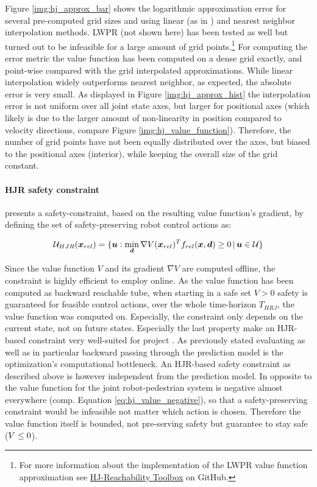 Figure \ref{img:hj_approx_bar} shows the logarithmic approximation error for several pre-computed grid sizes and using linear (as in \cite{Leung2020}) and nearest neighbor interpolation methods. LWPR (not shown here) has been tested as well but turned out to be infeasible for a large amount of grid points.\footnote{For more information about the implementation of the LWPR value function approximation see \href{https://github.com/simon-schaefer/HJReachibility}{HJ-Reachability Toolbox} on GitHub.} For computing the error metric the value function has been computed on a dense grid exactly, and point-wise compared with the grid interpolated approximations. While linear interpolation widely outperforms nearest neighbor, as expected, the absolute error is very small. As displayed in Figure \ref{img:hj_approx_hist} the interpolation error is not uniform over all joint state axes, but larger for positional axes (which likely is due to the larger amount of non-linearity in position compared to velocity directions, compare Figure \ref{img:hj_value_function}). Therefore, the number of grid points have not been equally distributed over the axes, but biased to the positional axes (interior), while keeping the overall size of the grid constant. 

\paragraph{\ac{HJR} safety constraint} 
\cite{Leung2020} presents a safety-constraint, based on the resulting value function's gradient, by defining the set of safety-preserving robot control actions as:

\begin{equation}
\mathcal{U}_{HJR} (\boldsymbol{x}_{rel}) = \{ \boldsymbol{u}: \min_{\boldsymbol{d}} \nabla V (\boldsymbol{x}_{rel})^T f_{rel}(\boldsymbol{x}, \boldsymbol{d}) \geq 0 \, | \, \boldsymbol{u} \in \mathcal{U} \}
\end{equation}

Since the value function $V$ and its gradient $\nabla V$ are computed offline, the constraint is highly efficient to employ online. As the value function has been computed as backward reachable tube, when starting in a safe set $V > 0$ safety is guaranteed for feasible control actions, over the whole time-horizon $T_{HRJ}$, the value function was computed on. Especially, the constraint only depends on the current state, not on future states. Especially the last property make an \ac{HJR}-based constraint very well-suited for project \project. As previously stated evaluating as well as in particular backward passing through the prediction model is the optimization's computational bottleneck. An \ac{HJR}-based safety constraint as described above is however independent from the prediction model. 
\newline
In opposite to \cite{Leung2020} the value function for the joint robot-pedestrian system is negative almost everywhere (comp. Equation \ref{eq:hj_value_negative}), so that a safety-preserving constraint would be infeasible not matter which action is chosen. Therefore the value function itself is bounded, not pre-serving safety but guarantee to stay safe ($V \leq 0$).

